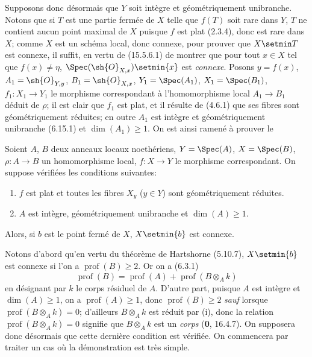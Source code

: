 \begin{env}[18.9.7.2]
\label{IV.18.9.7.2}
Supposons donc désormais que $Y$ soit intègre et géométriquement unibranche. Notons que si $T$ est une partie fermée de $X$ telle que $f(T)$ soit rare dans $Y$, $T$ ne contient aucun point maximal de $X$ puisque $f$ est plat (2.3.4), donc est rare dans $X$; comme $X$ est un schéma local, donc connexe, pour prouver que $X\setmin T$ est connexe, il suffit, en vertu de (15.5.6.1) de montrer que pour tout $x\in X$ tel que $f(x)\neq\eta$, $\Spec(\sh{O}_{X,x})\setmin\{x\}$ est \emph{connexe}. Posons $y=f(x)$, $A_1=\sh{O}_{Y,y}$, $B_1=\sh{O}_{X,x}$, $Y_1=\Spec(A_1)$, $X_1=\Spec(B_1)$, $f_1:X_1\to Y_1$ le morphisme correspondant à l'homomorphisme local $A_1\to B_1$ déduit de $\rho$; il est clair que $f_1$ est plat, et il résulte de (4.6.1) que ses fibres sont géométriquement réduites; en outre $A_1$ est intègre et géométriquement unibranche (6.15.1) et $\dim(A_1)\geq 1$. On est ainsi ramené à prouver le
\end{env}

\begin{lemma}[18.9.7.3]
\label{IV.18.9.7.3}
Soient $A$, $B$ deux anneaux locaux noethériens, $Y=\Spec(A)$, $X=\Spec(B)$, $\rho:A\to B$ un homomorphisme local, $f:X\to Y$ le morphisme correspondant. On suppose vérifiées les conditions suivantes:
\begin{enumerate}
  \item[\textup{(i)}] $f$ est plat et toutes les fibres $X_y$ \textup{(}$y\in Y$\textup{)} sont géométriquement réduites.
  \item[\textup{(ii)}] $A$ est intègre, géométriquement unibranche et $\dim(A)\geq 1$.
\end{enumerate}

Alors, si $b$ est le point fermé de $X$, $X\setmin\{b\}$ est connexe.
\end{lemma}

Notons d'abord qu'en vertu du théorème de Hartshorne (5.10.7), $X\setmin\{b\}$ est connexe si l'on a $\operatorname{prof}(B)\geq 2$. Or on a (6.3.1)
\begin{equation}
  \operatorname{prof}(B)=\operatorname{prof}(A)+\operatorname{prof}(B\otimes_A k)
  \tag{18.9.7.4}
  \label{IV.18.9.7.4}
\end{equation}
en désignant par $k$ le corps résiduel de $A$. D'autre part, puisque $A$ est intègre et $\dim(A)\geq 1$, on a $\operatorname{prof}(A)\geq 1$, donc $\operatorname{prof}(B)\geq 2$ \emph{sauf} lorsque $\operatorname{prof}(B\otimes_A k)=0$; d'ailleurs $B\otimes_A k$ est réduit par (i), donc la relation $\operatorname{prof}(B\otimes_A k)=0$ signifie que $B\otimes_A k$ est un \emph{corps} (\textbf{0}, 16.4.7). On supposera donc désormais que cette dernière condition est vérifiée. On commencera par traiter un cas où la démonstration est très simple.


